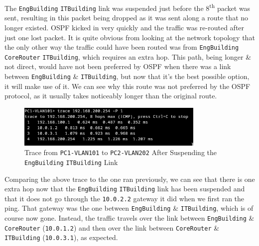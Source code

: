 \documentclass[a4paper]{article}
\begin{document}
The \verb|EngBuilding| {\leftrightarrow} \verb|ITBuilding| link was suspended just before the 8\textsuperscript{th} packet 
was sent, resulting in this packet being dropped as it was sent along a route that no longer existed. 
OSPF kicked in very quickly and the traffic was re-routed after just one lost packet. 
It is quite obvious from looking at the network topology that the only other way the traffic could have been routed was 
from \verb|EngBuilding| {\rightarrow} \verb|CoreRouter| {\rightarrow} \verb|ITBuilding|, which requires an extra hop. 
This path, being longer \& not direct, would have not been preferred by OSPF when there was a link between \verb|EngBuilding| 
\& \verb|ITBuilding|, but now that it's the best possible option, it will make use of it.
We can see why this route was not preferred by the OSPF protocol, as it usually takes noticeably longer than the original route.

\begin{figure}[H]
    \centering
    \includegraphics[width=0.8\textwidth]{./images/redo_trace.png}
    \caption{Trace from \texttt{PC1-VLAN101} to \texttt{PC2-VLAN202} After Suspending the \texttt{EngBuilding} {\leftrightarrow} \texttt{ITBuilding} Link}
\end{figure}

Comparing the above trace to the one ran previously, we can see that there is one extra hop now that the 
\verb|EngBuilding| {\leftrightarrow} \verb|ITBuilding| link has been suspended and that it does not go through the 
\verb|10.0.2.2| gateway it did when we first ran the ping.
That gateway was the one between \verb|EngBuilding| \& \verb|ITBuilding|, which is of course now gone. 
Instead, the traffic travels over the link between \verb|EngBuilding| \& \verb|CoreRouter| (\verb|10.0.1.2|) and then over 
the link between \verb|CoreRouter| \& \verb|ITBuilding| (\verb|10.0.3.1|), as expected.
\end{document}
